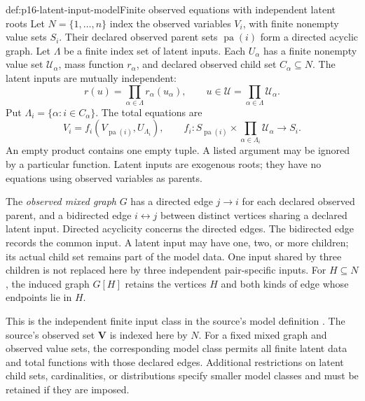 \begin{hbdefinition}{def:p16-latent-input-model}{Finite observed equations with independent latent roots}
Let \(N=\{1,\ldots,n\}\) index the observed variables \(V_i\),
with finite nonempty value sets \(S_i\). Their declared observed
parent sets \(\operatorname{pa}(i)\) form a directed acyclic graph.
Let \(\Lambda\) be a finite index set of latent inputs. Each
\(U_\alpha\) has a finite nonempty value set \(\mathcal U_\alpha\),
mass function \(r_\alpha\), and declared observed child set
\(C_\alpha\subseteq N\). The latent inputs are mutually independent:
\[
 r(u)=\prod_{\alpha\in\Lambda}r_\alpha(u_\alpha),
 \qquad u\in\mathcal U=\prod_{\alpha\in\Lambda}\mathcal U_\alpha.
\]
Put \(\Lambda_i=\{\alpha:i\in C_\alpha\}\). The total equations are
\[
 V_i=f_i(V_{\operatorname{pa}(i)},U_{\Lambda_i}),
 \qquad
 f_i:S_{\operatorname{pa}(i)}\times
          \prod_{\alpha\in\Lambda_i}\mathcal U_\alpha\longrightarrow S_i.
\]
An empty product contains one empty tuple. A listed argument may be
ignored by a particular function. Latent inputs are exogenous roots;
they have no equations using observed variables as parents.

The \emph{observed mixed graph} \(G\) has a directed edge
\(j\to i\) for each declared observed parent, and a bidirected
edge \(i\leftrightarrow j\) between distinct vertices sharing a
declared latent input. Directed acyclicity concerns the directed edges.
The bidirected edge records the common input. A latent input may have
one, two, or more children; its actual child set remains part of the
model data. One input shared by three children is not replaced here
by three independent pair-specific inputs.
For \(H\subseteq N\), the induced graph \(G[H]\) retains the
vertices \(H\) and both kinds of edge whose endpoints lie in \(H\).

This is the independent finite input class in the source's model
definition \cite[p.~1220]{ShpitserPearl2006JointIdentification}.
The source's observed set \(\mathbf V\) is indexed here by \(N\).
For a fixed mixed graph and observed value sets, the corresponding
model class permits all finite latent data and total functions with
those declared edges. Additional restrictions on latent child sets,
cardinalities, or distributions specify smaller model classes and
must be retained if they are imposed.
\end{hbdefinition}

